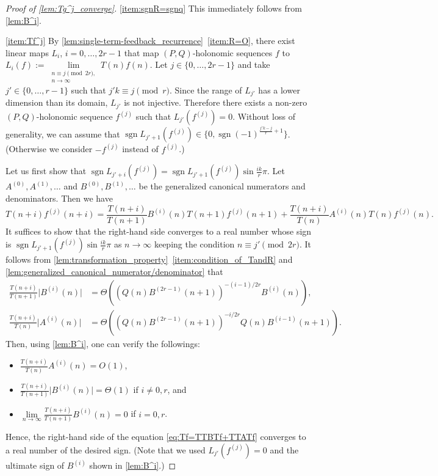 \documentclass[a4paper,UKenglish,cleveref,autoref,thm-restate]{lipics-v2021}
\DeclareMathOperator{\sgn}{sgn}
\begin{document}
\begin{proof}[Proof of \cref{lem:Tg^j_converge}]
\eqref{item:sgnR=sgnq} This immediately follows from \cref{lem:B^i}. 

\eqref{item:Tf^j} By \cref{lem:single-term-feedback_recurrence}~\eqref{item:R=O}, there exist linear maps $L_i$, $i=0, \dots, 2r-1$ that map $(P, Q)$-holonomic sequences $f$ to $L_i(f) := \lim\limits_{\substack{n \equiv j \pmod{2r}, \\ n \to \infty}} T(n)f(n)$. Let $j \in \{0, \dots, 2r-1 \}$ and take $j' \in \{ 0, \dots, r-1\}$ such that $j'k \equiv j \pmod{r}$. Since the range of $L_{j'}$ has a lower dimension than its domain, $L_{j'}$ is not injective. Therefore there exists a non-zero $(P, Q)$-holonomic sequence $f^{(j)}$ such that $L_{j'}(f^{(j)}) = 0$. Without loss of generality, we can assume that $\sgn L_{j'+1}(f^{(j)}) \in \{ 0, \sgn (-1)^{\frac{j'k - j}r + 1} \}$. (Otherwise we consider $-f^{(j)}$ instead of $f^{(j)}$.)

Let us first show that $\sgn L_{j' + i} (f^{(j)}) = \sgn L_{j'+1} (f^{(j)}) \sin \frac{ik}r \pi$. Let $A^{(0)}, A^{(1)}, \dots$ and $B^{(0)}, B^{(1)}, \dots$ be the generalized canonical numerators and denominators. Then we have 
\begin{equation}\label{eq:Tf=TTBTf+TTATf}
T(n+i)f^{(j)}(n + i) 
=
\frac{T(n+i)}{T(n+1)} B^{(i)}(n) T(n+1)f^{(j)}(n+1) 
+ \frac{T(n+i)}{T(n)} A^{(i)}(n) T(n)f^{(j)}(n). 
\end{equation}
It suffices to show that the right-hand side converges to a real number whose sign is $\sgn L_{j'+1} (f^{(j)}) \sin \frac{ik}r \pi$ as $n \to \infty$ keeping the condition $n \equiv j' \pmod{2r}$. It follows from \cref{lem:transformation_property}~\eqref{item:condition_of_TandR} and \cref{lem:generalized_canonical_numerator/denominator} that 
\begin{align*}
\frac{T(n+i)}{T(n+1)} \lvert B^{(i)}(n) \rvert &= \Theta\left(\left(Q(n) B^{(2r-1)}(n+1)\right)^{-(i-1) / 2r} B^{(i)}(n)\right), 
\\
\frac{T(n+i)}{T(n)} \lvert A^{(i)}(n) \rvert &= \Theta\left(\left(Q(n) B^{(2r-1)}(n+1)\right)^{-i / 2r} Q(n)B^{(i-1)}(n+1)\right). 
\end{align*}
Then, using \cref{lem:B^i}, one can verify the followings:
\begin{itemize}
    \item $\frac{T(n+i)}{T(n)} A^{(i)}(n) = O(1)$, 
    \item $\frac{T(n+i)}{T(n+1)} \lvert B^{(i)}(n) \rvert = \Theta(1)$ if $i \neq 0, r$, and
    \item $\lim\limits_{n\to\infty} \frac{T(n+i)}{T(n+1)} B^{(i)}(n) = 0$ if $i = 0, r$. 
\end{itemize}
Hence, the right-hand side of the equation \eqref{eq:Tf=TTBTf+TTATf} converges to a real number of the desired sign.
(Note that we used $L_{j'}(f^{(j)}) = 0$ and the ultimate sign of $B^{(i)}$ shown in \cref{lem:B^i}.) 


\end{proof}
\end{document}
